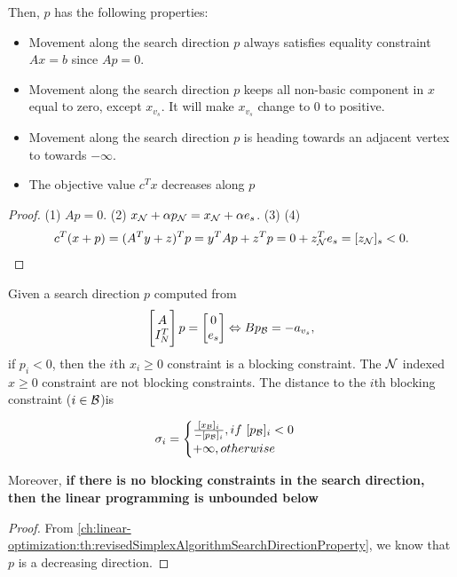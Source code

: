 \begin{refsection}
\begin{lemma}
Then, $p$ has the following properties:
\begin{itemize}
	\item Movement along the search direction $p$ always satisfies equality constraint $Ax = b$ since $Ap = 0$.
	\item Movement along the search direction $p$ keeps all non-basic component in $x$ equal to zero, except $x_{v_s}$.
	It will make $x_{v_s}$ change to 0 to positive.
	\item Movement along the search direction $p$ is heading towards an adjacent vertex to towards $-\infty$.
	\item The objective value $c^Tx$ decreases along $p$ 
\end{itemize}
\end{lemma}
\begin{proof}
(1) $Ap = 0$. (2) $x_{\mathcal{N}} + \alpha p_{\mathcal{N}} = x_{\mathcal{N}} + \alpha e_s$.	(3)
(4) 	
$$c^T(x + p) = (A^Ty + z)^T p = y^TAp + z^Tp = 0 + z^T_{\mathcal{N}} e_s = [z_{\mathcal{N}}]_s < 0.$$
\end{proof}

\begin{lemma}Given a search direction $p$ computed from
$$\begin{bmatrix}
	A\\
	I^T_N
	\end{bmatrix} p = \begin{bmatrix}
	0\\
	e_s
\end{bmatrix} \Leftrightarrow Bp_{\mathcal{B}} = -a_{v_s},$$	
if $p_i < 0$, then the $i$th $x_i \geq 0$ constraint is a blocking constraint. 
The $\mathcal{N}$ indexed $x\geq 0$ constraint are not blocking constraints.
The distance to the $i$th blocking constraint ($i\in \mathcal{B}$)is

$$\sigma_i = \begin{cases}
\frac{[x_{\mathcal{B}}]_i}{-[p_{\mathcal{B}}]_i}, if~ [p_{\mathcal{B}}]_i < 0\\
+\infty, otherwise 
\end{cases}$$

Moreover, \textbf{if there is no blocking constraints in the search direction, then the linear programming is unbounded below} 
\end{lemma}
\begin{proof}
From \autoref{ch:linear-optimization:th:revisedSimplexAlgorithmSearchDirectionProperty}, we know that $p$ is a decreasing direction.
\end{proof}





\end{refsection}
